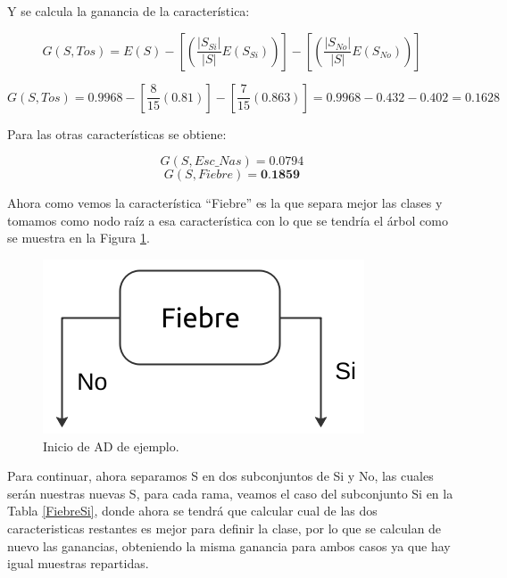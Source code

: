 \documentclass[twoside,spanish,ESP,MSc]{plantillaLabUPV}
\theoremstyle{definition}
\begin{document}
Y se calcula la ganancia de la característica:

$$G(S,Tos) = E(S) - \left[\left(\frac{|S_{Si}|}{|S|} E(S_{Si})\right) \right] - \left[\left(\frac{|S_{No}|}{|S|} E(S_{No})\right) \right] $$

$$G(S,Tos) = 0.9968 - \left[\frac{8}{15} (0.81) \right] - \left[\frac{7}{15} (0.863) \right] = 0.9968 - 0.432 - 0.402 = 0.1628$$

Para las otras características se obtiene:

$$G(S,Esc\_Nas) = 0.0794$$
$$G(S,Fiebre) = \textbf{0.1859}$$

Ahora como vemos la característica ``Fiebre'' es la que separa mejor las clases y tomamos como nodo raíz a esa característica con lo que se tendría el árbol como se muestra en la Figura \ref{arbolito}.

\begin{figure}[!tbh] 
	\centering 
	\includegraphics[scale=.4]{edrawimas/arbolito} 
	\caption{Inicio de AD de ejemplo.} 
	\label{arbolito} 
\end{figure}

Para continuar, ahora separamos S en dos subconjuntos de Si y No, las cuales serán nuestras nuevas S, para cada rama, veamos el caso del subconjunto Si en la Tabla \ref{FiebreSi}, donde ahora se tendrá que calcular cual de las dos caracteristicas restantes es mejor para definir la clase, por lo que se calculan de nuevo las ganancias, obteniendo la misma ganancia para ambos casos ya que hay igual muestras repartidas.
\end{document}
